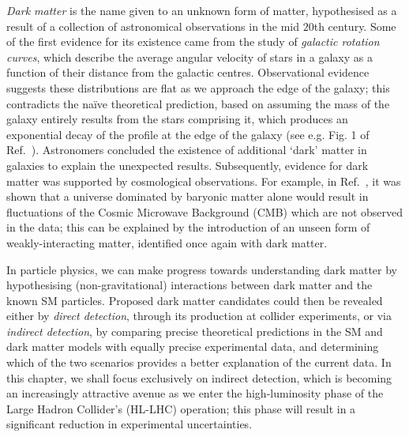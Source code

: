 \documentclass[withindex,glossary]{cam-thesis}
\begin{document}
\textit{Dark matter} is the name given to an unknown form of matter, hypothesised as a result of a collection of astronomical observations in the mid $20$th century. Some of the first evidence for its existence came from the study of \textit{galactic rotation curves}, which describe the average angular velocity of stars in a galaxy as a function of their distance from the galactic centres. Observational evidence suggests these distributions are flat as we approach the edge of the galaxy; this contradicts the na\"{i}ve theoretical prediction, based on assuming the mass of the galaxy entirely results from the stars comprising it, which produces an exponential decay of the profile at the edge of the galaxy (see e.g. Fig. 1 of Ref.~\cite{1972ApJ}). Astronomers concluded the existence of additional `dark' matter in galaxies to explain the unexpected results. Subsequently, evidence for dark matter was supported by cosmological observations. For example, in Ref.~\cite{Peebles1982LargescaleBT}, it was shown that a universe dominated by baryonic matter alone would result in fluctuations of the Cosmic Microwave Background (CMB) which are not observed in the data; this can be explained by the introduction of an unseen form of weakly-interacting matter, identified once again with dark matter.

In particle physics, we can make progress towards understanding dark matter by hypothesising (non-gravitational) interactions between dark matter and the known SM particles. Proposed dark matter candidates could then be revealed either by \textit{direct detection}, through its production at collider experiments, or via \textit{indirect detection}, by comparing precise theoretical predictions in the SM and dark matter models with equally precise experimental data, and determining which of the two scenarios provides a better explanation of the current data. In this chapter, we shall focus exclusively on indirect detection, which is becoming an increasingly attractive avenue as we enter the high-luminosity phase of the Large Hadron Collider's (HL-LHC) operation; this phase will result in a significant reduction in experimental uncertainties.
\end{document}
